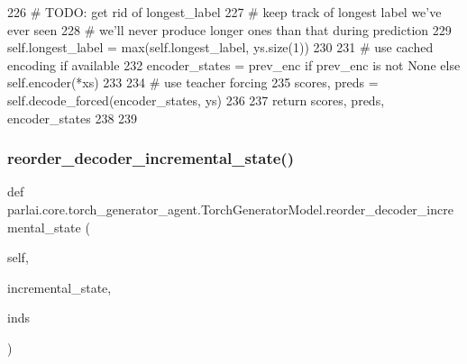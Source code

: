 \begin{DoxyCode}
226         \textcolor{comment}{# TODO: get rid of longest\_label}
227         \textcolor{comment}{# keep track of longest label we've ever seen}
228         \textcolor{comment}{# we'll never produce longer ones than that during prediction}
229         self.longest\_label = max(self.longest\_label, ys.size(1))
230 
231         \textcolor{comment}{# use cached encoding if available}
232         encoder\_states = prev\_enc \textcolor{keywordflow}{if} prev\_enc \textcolor{keywordflow}{is} \textcolor{keywordflow}{not} \textcolor{keywordtype}{None} \textcolor{keywordflow}{else} self.encoder(*xs)
233 
234         \textcolor{comment}{# use teacher forcing}
235         scores, preds = self.decode\_forced(encoder\_states, ys)
236 
237         \textcolor{keywordflow}{return} scores, preds, encoder\_states
238 
239 
\end{DoxyCode}
\mbox{\label{classparlai_1_1core_1_1torch__generator__agent_1_1TorchGeneratorModel_a828d2881fb73ead7d27691c73d1f6f36}} 
\subsubsection{\texorpdfstring{reorder\+\_\+decoder\+\_\+incremental\+\_\+state()}{reorder\_decoder\_incremental\_state()}}
{\footnotesize\ttfamily def parlai.\+core.\+torch\+\_\+generator\+\_\+agent.\+Torch\+Generator\+Model.\+reorder\+\_\+decoder\+\_\+incremental\+\_\+state (\begin{DoxyParamCaption}\item[{}]{self,  }\item[{}]{incremental\+\_\+state,  }\item[{}]{inds }\end{DoxyParamCaption})}

